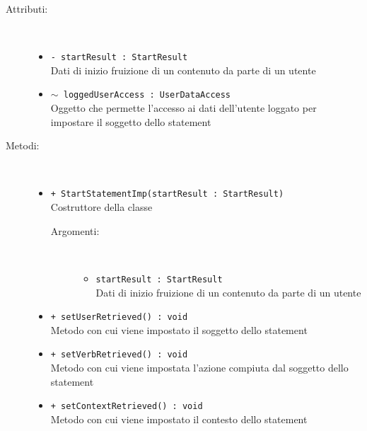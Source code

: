 \documentclass[../Tesi.tex]{subfiles}
\begin{document}
		\begin{description}
			\item[Attributi:] \
			\begin{itemize}
				\item \texttt{- startResult : StartResult}\\
				Dati di inizio fruizione di un contenuto da parte di un utente

				\item \texttt{$\sim$ loggedUserAccess : UserDataAccess}\\
				Oggetto che permette l'accesso ai dati dell'utente loggato per impostare il soggetto dello statement
			\end{itemize}

			\item[Metodi:] \
			\begin{itemize}
				\item \texttt{+ StartStatementImp(startResult : StartResult)}\\
				Costruttore della classe 
				\begin{description}
					\item[Argomenti:] \
					\begin{itemize}
						\item \texttt{startResult : StartResult}\\
						Dati di inizio fruizione di un contenuto da parte di un utente
					\end{itemize}
				\end{description}

				\item \texttt{+ setUserRetrieved() : void}\\
				Metodo con cui viene impostato il soggetto dello statement

				\item \texttt{+ setVerbRetrieved() : void}\\
				Metodo con cui viene impostata l'azione compiuta dal soggetto dello statement

				\item \texttt{+ setContextRetrieved() : void}\\
				Metodo con cui viene impostato il contesto dello statement
			\end{itemize}
		\end{description}
\end{document}
